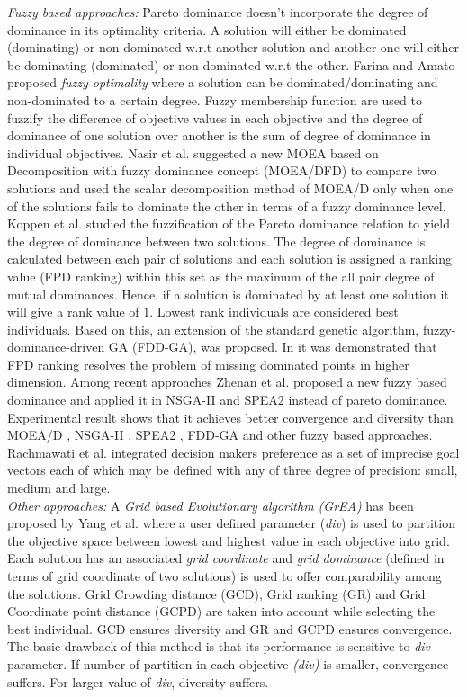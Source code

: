 \documentclass[journal]{IEEEtran}
\begin{document}
\textit{Fuzzy based approaches:}
Pareto dominance doesn't incorporate the degree of dominance in its optimality criteria. A solution will either be dominated (dominating) or non-dominated w.r.t another solution and another one will either be dominating (dominated) or non-dominated w.r.t the other. Farina and Amato \cite{farina2004fuzzy} proposed \textit{fuzzy optimality} where a solution can be dominated/dominating and non-dominated to a certain degree. Fuzzy membership function are used to fuzzify the difference of objective values in each objective and the degree of dominance of one solution over another is the sum of degree of dominance in individual objectives. Nasir et al. \cite{5949696} suggested a new MOEA based on Decomposition with fuzzy dominance concept (MOEA/DFD) to compare two solutions and used the scalar decomposition method of MOEA/D only when one of the solutions fails to dominate the other in terms of a fuzzy dominance level. Koppen et al. \cite{koppen2003fuzzy} studied the fuzzification of the Pareto dominance relation to yield the degree of dominance between two solutions. The degree of dominance is calculated between each pair of solutions and each solution is assigned a ranking value (FPD ranking) within this set as the maximum of the all pair degree of mutual dominances. Hence, if a solution is dominated by at least one solution it will give a rank value of $1$. Lowest rank individuals are considered best individuals. Based on this, an extension of the standard genetic algorithm, fuzzy-dominance-driven GA (FDD-GA), was proposed. In \cite{koppen2005fuzzy} it was demonstrated that FPD ranking resolves the problem of missing dominated points in higher dimension. Among recent approaches Zhenan et al. \cite{he2012new}\cite{he2014fuzzy} proposed a new fuzzy based dominance and applied it in NSGA-II and SPEA2 instead of pareto dominance. Experimental result shows that it achieves better convergence and diversity than MOEA/D \cite{zhang2007moea}, NSGA-II \cite{deb2002fast}, SPEA2 \cite{zitzler2001spea2}, FDD-GA \cite{koppen2003fuzzy} and other fuzzy based approaches. Rachmawati et al. \cite{rachmawati2010incorporation} integrated decision makers preference as a set of imprecise goal vectors each of which may be defined with any of three degree of precision: small, medium and large.\\

\textit{Other approaches:}
A \textit{Grid based Evolutionary algorithm (GrEA)} has been proposed by Yang et al. \cite{yang2013grid} where a user defined parameter (\textit{div}) is used to partition the objective space between lowest and highest value in each objective into grid. Each solution has an associated \textit{grid coordinate} and \textit{grid dominance} (defined in terms of grid coordinate of two solutions) is used to offer comparability among the solutions. Grid Crowding distance (GCD), Grid ranking (GR) and Grid Coordinate point distance (GCPD) are taken into account while selecting the best individual. GCD ensures diversity and GR and GCPD ensures convergence. The basic drawback of this method is that its performance is sensitive to \textit{div} parameter. If number of partition in each objective \textit{(div)} is smaller, convergence suffers. For larger value of \textit{div}, diversity suffers. 
\end{document}
